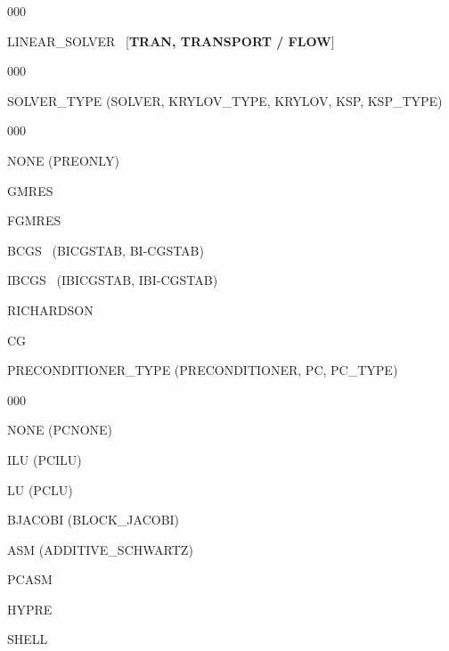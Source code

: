 \documentclass[12pt]{article}
\begin{document}
\begin{deflist}{000}
\item[LINEAR\_SOLVER] \ [{\bf TRAN, TRANSPORT / FLOW}]

\begin{deflist}{000}
\item[SOLVER\_TYPE (SOLVER, KRYLOV\_TYPE, KRYLOV, KSP, KSP\_TYPE)] ~

\begin{deflist}{000}
\item[NONE (PREONLY)]
\item[GMRES]
\item[FGMRES]
\item[BCGS] \ (BICGSTAB, BI-CGSTAB)
\item[IBCGS] \ (IBICGSTAB, IBI-CGSTAB)
\item[RICHARDSON]
\item[CG]
\end{deflist}

\item[PRECONDITIONER\_TYPE (PRECONDITIONER, PC, PC\_TYPE)] ~

\begin{deflist}{000}
\item[NONE (PCNONE)]
\item[ILU (PCILU)]
\item[LU (PCLU)]
\item[BJACOBI (BLOCK\_JACOBI)]
\item[ASM (ADDITIVE\_SCHWARTZ)]
\item[PCASM]
\item[HYPRE]
\item[SHELL]
\end{deflist}


\end{deflist}
\end{deflist}
\end{document}
